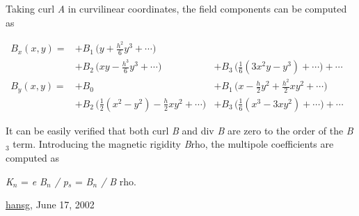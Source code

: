  Taking curl \textit{A} in curvilinear coordinates, the field components can be computed as 


\[
\begin{aligned}
B_x(x,y) =
&+ B_1\,\Big(y+\frac{h^2}{6}y^3+\cdots\Big)&  &  \\
&+ B_2\,\Big(xy - \frac{h^3}{6}y^3+\cdots \Big)&+B_3\,\Big(\frac{1}{6}(3x^2y-y^3)+ \cdots \Big)+\cdots\\
B_y(x,y)=
&+ B_0 & + B_1\,\Big(x-\frac{h}{2}y^2+\frac{h^2}{2}xy^2+\cdots \Big)\\
&+ B_2\,\Big(\frac{1}{2}(x^2-y^2)-\frac{h}{2}xy^2+\cdots \Big) & + B_3\,\Big(\frac{1}{6}(x^3-3xy^2)+ \cdots \Big)+\cdots
\end{aligned}
\]

 It can be easily verified that both curl \textit{B} and div \textit{B} are zero to the order of the \textit{B}$_3$ term. Introducing the magnetic rigidity \textit{B}rho, the multipole coefficients are computed as 

\textit{K$_n$} = \textit{e B$_n$ / p$_s$} =  \textit{B$_n$ / B} rho. 



\href{http://www.cern.ch/Hans.Grote/hansg_sign.html}{hansg}, June 17, 2002 

